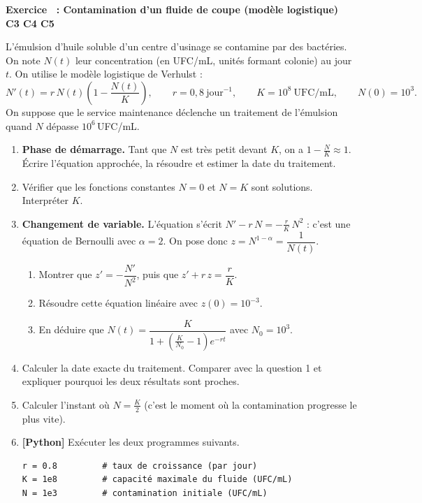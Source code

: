 \documentclass[a4paper,11pt]{article}
\newcounter{exo}
\newcommand{\exo}[4]{\needspace{0.5\textheight}\refstepcounter{exo}\label{exo:\theexo}\vspace{8pt}%
\begin{tcolorbox}[colback=uimmlightblue, colframe=uimmblue, boxrule=0.8pt, arc=2pt, left=6pt, right=6pt, top=3pt, bottom=3pt]
{\color{uimmblue}\bfseries Exercice \theexo\ : #1}\\
{\small\color{uimmred}\bfseries #2\quad #3}%
\if\relax\detokenize{#4}\relax\else\\{\footnotesize\color{uimmgray}\itshape #4}\fi
\end{tcolorbox}}
\newcommand{\rep}[1]{\par\noindent\begin{minipage}[t][#1cm]{\linewidth}\mbox{}\end{minipage}\par}
\newcommand{\py}{{\color{uimmred}\small\bfseries[Python]}}
\begin{document}
\exo{Contamination d'un fluide de coupe (modèle logistique)}{C3 C4 C5}{[S01] [C01] [C02] [C03]}{}
L'émulsion d'huile soluble d'un centre d'usinage se contamine par des bactéries. On note $N(t)$ leur concentration (en UFC/mL, unités formant colonie) au jour $t$. On utilise le modèle logistique de Verhulst :
\[
N'(t) = r\,N(t)\left(1 - \frac{N(t)}{K}\right), \qquad r = 0{,}8\ \text{jour}^{-1}, \qquad K = 10^8\ \text{UFC/mL}, \qquad N(0) = 10^3 .
\]
On suppose que le service maintenance déclenche un traitement de l'émulsion quand $N$ dépasse $10^6$\,UFC/mL.
\begin{enumerate}
  \needspace{5.6cm}
  \item \textbf{Phase de démarrage.} Tant que $N$ est très petit devant $K$, on a $1 - \frac{N}{K} \approx 1$. Écrire l'équation approchée, la résoudre et estimer la date du traitement.
  \rep{3.5}
  \needspace{4.1cm}
  \item Vérifier que les fonctions constantes $N = 0$ et $N = K$ sont solutions. Interpréter $K$.
  \rep{2}
  \item \textbf{Changement de variable.} L'équation s'écrit $N' - r\,N = -\frac{r}{K}\,N^2$ : c'est une équation de Bernoulli avec $\alpha = 2$. On pose donc $z = N^{1-\alpha} = \dfrac{1}{N(t)}$.
  \begin{enumerate}
    \needspace{5.1cm}
    \item Montrer que $z' = -\dfrac{N'}{N^2}$, puis que $z' + r\,z = \dfrac{r}{K}$.
    \rep{3.5}
    \needspace{4.1cm}
    \item Résoudre cette équation linéaire avec $z(0) = 10^{-3}$.
    \rep{2.5}
    \needspace{4.6cm}
    \item En déduire que $N(t) = \dfrac{K}{1 + \left(\frac{K}{N_0} - 1\right)e^{-r t}}$ avec $N_0 = 10^3$.
    \rep{2.5}
  \end{enumerate}
  \needspace{5.1cm}
  \item Calculer la date exacte du traitement. Comparer avec la question 1 et expliquer pourquoi les deux résultats sont proches.
  \rep{3}
  \needspace{4.6cm}
  \item Calculer l'instant où $N = \frac{K}{2}$ (c'est le moment où la contamination progresse le plus vite).
  \rep{2.5}
  \needspace{7.5cm}
  \item \py{} Exécuter les deux programmes suivants.
\begin{lstlisting}[style=uimmpython]
r = 0.8         # taux de croissance (par jour)
K = 1e8         # capacité maximale du fluide (UFC/mL)
N = 1e3         # contamination initiale (UFC/mL)

\end{lstlisting}
\end{enumerate}
\end{document}

